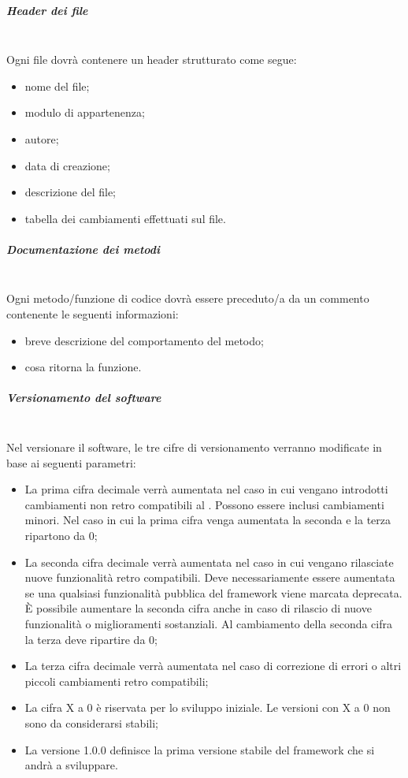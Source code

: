 \subparagraph{Header dei file} \hfill \\

Ogni file dovrà contenere un header strutturato come segue:
\begin{itemize}
\item {} nome del file;
\item {} modulo di appartenenza;
\item {} autore;
\item {} data di creazione;
\item {} descrizione del file;
\item {} tabella dei cambiamenti effettuati sul file.
\end{itemize}

\subparagraph{Documentazione dei metodi} \hfill \\

Ogni metodo/funzione di codice dovrà essere preceduto/a da un commento contenente le seguenti informazioni:
\begin{itemize}
\item {} breve descrizione del comportamento del metodo;
\item {} cosa ritorna la funzione.
\end{itemize}



\subparagraph{Versionamento del software} \hfill \\

Nel versionare il software, le tre cifre di versionamento verranno modificate in base ai seguenti parametri:
\begin{itemize}
\item La prima cifra decimale verrà aumentata nel caso in cui vengano introdotti cambiamenti non retro compatibili al . Possono essere inclusi cambiamenti minori. Nel caso in cui la prima cifra venga aumentata la seconda e la terza ripartono da 0;
\item La seconda cifra decimale verrà aumentata nel caso in cui vengano rilasciate nuove funzionalità retro compatibili. Deve necessariamente essere aumentata se una qualsiasi funzionalità pubblica del framework viene marcata deprecata. È possibile aumentare la seconda cifra anche in caso di rilascio di nuove funzionalità o miglioramenti sostanziali. Al cambiamento della seconda cifra la terza deve ripartire da 0;
\item La terza cifra decimale verrà aumentata nel caso di correzione di errori o altri piccoli cambiamenti retro compatibili;
\item La cifra X a 0 è riservata per lo sviluppo iniziale. Le versioni con X a 0 non sono da considerarsi stabili;
\item La versione 1.0.0 definisce la prima versione stabile del framework che si andrà a sviluppare.
\end{itemize}

